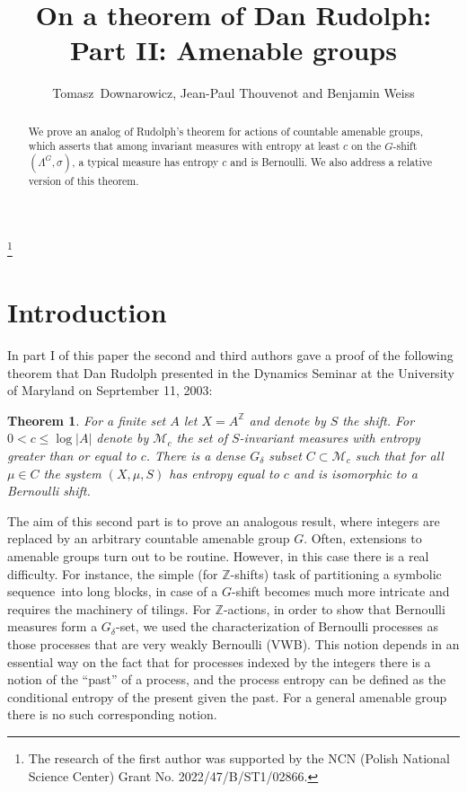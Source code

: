 \documentclass{amsart}
\author{Tomasz\ Downarowicz, Jean-Paul Thouvenot and Benjamin Weiss}
\title{On a theorem of Dan Rudolph: Part II: Amenable groups}
\newtheorem{thm}{Theorem}[section]
\theoremstyle{remark}
\def \Z {\mathbb Z}
\def \M {\mathcal M}
\def \sq {sequence}
\def \im {invariant measure}
\begin{document}
\begin{abstract}We prove an analog of Rudolph's theorem for actions of countable amenable groups, which asserts that among \im s with entropy at least $c$ on the $G$-shift $(\Lambda^G,\sigma)$, a typical measure has entropy $c$ and is Bernoulli. We also address a relative version of this theorem.  
\end{abstract}

\thanks{The research of the first author was supported
by the NCN (Polish National Science Center) Grant No. 2022/47/B/ST1/02866.}


\maketitle

\section{Introduction}
In part I of this paper the second and third authors gave a proof of the following theorem that Dan Rudolph presented in the Dynamics Seminar at the University of Maryland 
on Seprtember 11, 2003:

\begin{thm} For a finite set $A$ let $X = A^\Z$ and denote by $S$ the shift.  For $0<c\le\log|A|$  denote by $\M_c$ the set of $S$-invariant measures with entropy greater than or equal to $c$. There is a dense $G_\delta$ subset $C\subset  \M_c$ such that for all $\mu\in C$ the system $(X,\mu,S)$ has entropy equal to $c$ and is isomorphic to a Bernoulli shift.
\end{thm}

The aim of this second part is to prove an analogous result, where integers are replaced by an arbitrary countable amenable  group $G$. Often, extensions 
to amenable groups turn out to be routine. However, in this case there is a real difficulty. 
For instance, the simple (for $\Z$-shifts) task of partitioning a symbolic \sq\ into long blocks, in case of a $G$-shift becomes much more intricate and requires the machinery of tilings.
For $\Z$-actions, in order to show that Bernoulli measures form a $G_\delta$-set, we used the characterization of Bernoulli processes as those processes that are very weakly Bernoulli (VWB). This notion depends in an essential way on the fact that for processes indexed by the integers there is a notion of the ``past'' of a process, and the process entropy can be defined as the conditional entropy of the present given the past. For a general amenable group there is no such corresponding notion. 
  
\end{document}

